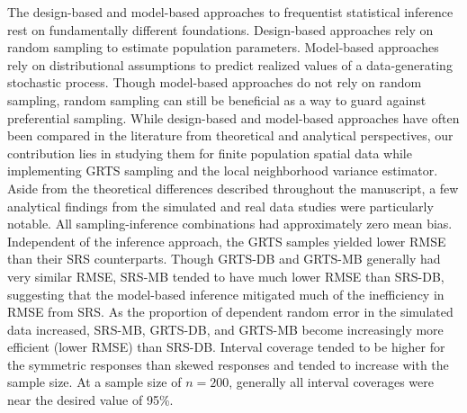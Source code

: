 \documentclass[]{elsarticle} %
\begin{document}
The design-based and model-based approaches to frequentist statistical
inference rest on fundamentally different foundations. Design-based
approaches rely on random sampling to estimate population parameters.
Model-based approaches rely on distributional assumptions to predict
realized values of a data-generating stochastic process. Though
model-based approaches do not rely on random sampling, random sampling
can still be beneficial as a way to guard against preferential sampling.
While design-based and model-based approaches have often been compared
in the literature from theoretical and analytical perspectives, our
contribution lies in studying them for finite population spatial data
while implementing GRTS sampling and the local neighborhood variance
estimator. Aside from the theoretical differences described throughout
the manuscript, a few analytical findings from the simulated and real
data studies were particularly notable. All sampling-inference
combinations had approximately zero mean bias. Independent of the
inference approach, the GRTS samples yielded lower RMSE than their SRS
counterparts. Though GRTS-DB and GRTS-MB generally had very similar
RMSE, SRS-MB tended to have much lower RMSE than SRS-DB, suggesting that
the model-based inference mitigated much of the inefficiency in RMSE
from SRS. As the proportion of dependent random error in the simulated
data increased, SRS-MB, GRTS-DB, and GRTS-MB become increasingly more
efficient (lower RMSE) than SRS-DB. Interval coverage tended to be
higher for the symmetric responses than skewed responses and tended to
increase with the sample size. At a sample size of \(n = 200\),
generally all interval coverages were near the desired value of 95\%.
\end{document}
